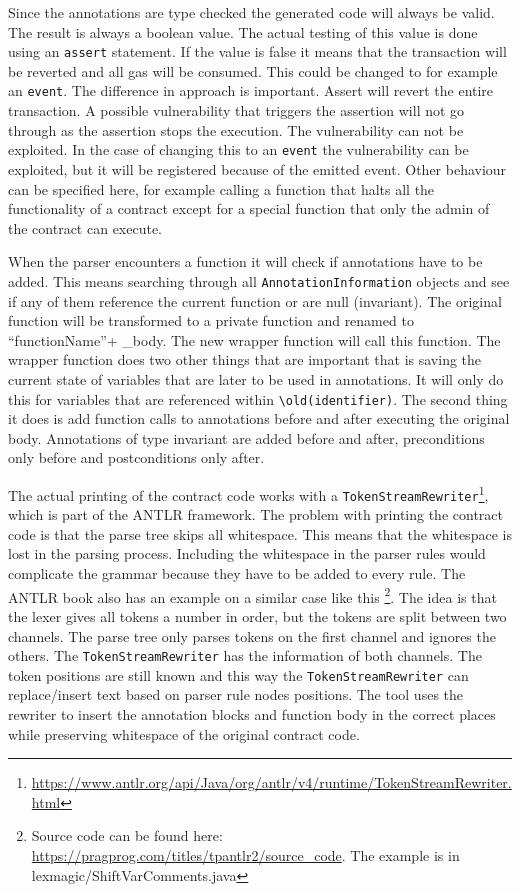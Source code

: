 \documentclass[a4paper]{article}
\begin{document}
Since the annotations are type checked the generated code will always be valid. The result is always a boolean value. The actual testing of this value is done using an \texttt{assert} statement. If the value is false it means that the transaction will be reverted and all gas will be consumed. This could be changed to for example an \texttt{event}. The difference in approach is important. Assert will revert the entire transaction. A possible vulnerability that triggers the assertion will not go through as the assertion stops the execution. The vulnerability can not be exploited. In the case of changing this to an \texttt{event} the vulnerability can be exploited, but it will be registered because of the emitted event. Other behaviour can be specified here, for example calling a function that halts all the functionality of a contract except for a special function that only the admin of the contract can execute.\par
When the parser encounters a function it will check if annotations have to be added. This means searching through all \texttt{AnnotationInformation} objects and see if any of them reference the current function or are null (invariant). The original function will be transformed to a private function and renamed to ``functionName''+ \_body. The new wrapper function will call this function. The wrapper function does two other things that are important that is saving the current state of variables that are later to be used in annotations. It will only do this for variables that are referenced within \texttt{\textbackslash old(identifier)}. The second thing it does is add function calls to annotations before and after executing the original body. Annotations of type invariant are added before and after, preconditions only before and postconditions only after. \par
The actual printing of the contract code works with a \texttt{TokenStreamRewriter}\footnote{\url{https://www.antlr.org/api/Java/org/antlr/v4/runtime/TokenStreamRewriter.html}}, which is part of the ANTLR framework. The problem with printing the contract code is that the parse tree skips all whitespace. This means that the whitespace is lost in the parsing process. Including the whitespace in the parser rules would complicate the grammar because they have to be added to every rule. The ANTLR book also has an example on a similar case like this \footnote{Source code can be found here: \url{https://pragprog.com/titles/tpantlr2/source_code}. The example is in lexmagic/ShiftVarComments.java}. The idea is that the lexer gives all tokens a number in order, but the tokens are split between two channels. The parse tree only parses tokens on the first channel and ignores the others. The \texttt{TokenStreamRewriter} has the information of both channels. The token positions are still known and this way the \texttt{TokenStreamRewriter} can replace/insert text based on parser rule nodes positions. The tool uses the rewriter to insert the annotation blocks and function body in the correct places while preserving whitespace of the original contract code.
\end{document}
